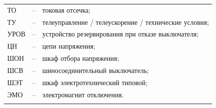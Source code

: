 \begin{longtable}{>{\raggedright\arraybackslash}m{2cm}>{\raggedright\arraybackslash}m{0.5cm}>{\raggedright\arraybackslash}m{20cm}}
ТО & -- & токовая отсечка; \\
ТУ & -- & телеуправление / телеускорение / технические условия; \\
УРОВ & -- & устройство резервирования при отказе выключателя; \\
ЦН & -- & цепи напряжения; \\
ШОН & -- & шкаф отбора напряжения; \\
ШСВ & -- & шиносоединительный выключатель; \\
ШЭТ & -- & шкаф электротехнический типовой; \\
ЭМО & -- & электромагнит отключения. \\
{\color{white}\fontsize{0.1pt}{0.1pt}\selectfont<endABBRS>}
\end{longtable}
